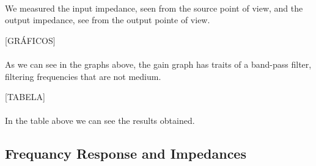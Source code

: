 \paragraph{} We measured the input impedance, seen from the source point of view, and the output impedance, see from the output pointe of view.

[GRÁFICOS]

\paragraph{} As we can see in the graphs above, the gain graph has traits of a band-pass filter, filtering frequencies that are not medium.

[TABELA]

\paragraph{} In the table above we can see the results obtained.

\subsection{Frequancy Response and Impedances}